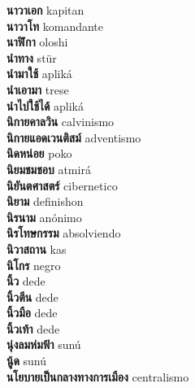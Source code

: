 \textbf{ นาวาเอก  } kapitan \\
\textbf{ นาวาโท  } komandante \\
\textbf{ นาฬิกา  } oloshi \\
\textbf{ นำทาง  } stür \\
\textbf{ นำมาใช้  } apliká \\
\textbf{ นำเอามา  } trese \\
\textbf{ นำไปใช้ได้  } apliká \\
\textbf{ นิกายคาลวิน  } calvinismo \\
\textbf{ นิกายแอดเวนติสม์  } adventismo \\
\textbf{ นิดหน่อย  } poko \\
\textbf{ นิยมชมชอบ  } atmirá \\
\textbf{ นิยันตศาสตร์  } cibernetico \\
\textbf{ นิยาม  } definishon \\
\textbf{ นิรนาม  } anónimo \\
\textbf{ นิรโทษกรรม  } absolviendo \\
\textbf{ นิวาสถาน  } kas \\
\textbf{ นิโกร  } negro \\
\textbf{ นิ้ว  } dede \\
\textbf{ นิ้วตีน  } dede \\
\textbf{ นิ้วมือ  } dede \\
\textbf{ นิ้วเท้า  } dede \\
\textbf{ นุ่งลมห่มฟ้า  } sunú \\
\textbf{ นู้ด  } sunú \\
\textbf{ นโยบายเป็นกลางทางการเมือง  } centralismo \\
